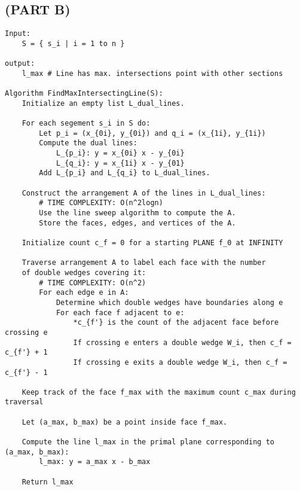\documentclass{article}
\begin{document}
\newpage

\subsection*{(PART B)}
\begin{verbatim}
Input:
    S = { s_i | i = 1 to n }

output:
    l_max # Line has max. intersections point with other sections

Algorithm FindMaxIntersectingLine(S): 
    Initialize an empty list L_dual_lines.

    For each segement s_i in S do:
        Let p_i = (x_{0i}, y_{0i}) and q_i = (x_{1i}, y_{1i})
        Compute the dual lines:
            L_{p_i}: y = x_{0i} x - y_{0i}
            L_{q_i}: y = x_{1i} x - y_{01}
        Add L_{p_i} and L_{q_i} to L_dual_lines.

    Construct the arrangement A of the lines in L_dual_lines:
        # TIME COMPLEXITY: O(n^2logn)
        Use the line sweep algorithm to compute the A.
        Store the faces, edges, and vertices of the A.

    Initialize count c_f = 0 for a starting PLANE f_0 at INFINITY

    Traverse arrangement A to label each face with the number 
    of double wedges covering it: 
        # TIME COMPLEXITY: O(n^2)
        For each edge e in A:
            Determine which double wedges have boundaries along e
            For each face f adjacent to e:
                *c_{f'} is the count of the adjacent face before crossing e
                If crossing e enters a double wedge W_i, then c_f = c_{f'} + 1
                If crossing e exits a double wedge W_i, then c_f = c_{f'} - 1
    
    Keep track of the face f_max with the maximum count c_max during traversal
    
    Let (a_max, b_max) be a point inside face f_max.

    Compute the line l_max in the primal plane corresponding to (a_max, b_max):
        l_max: y = a_max x - b_max

    Return l_max

\end{verbatim}

\newpage
\end{document}
